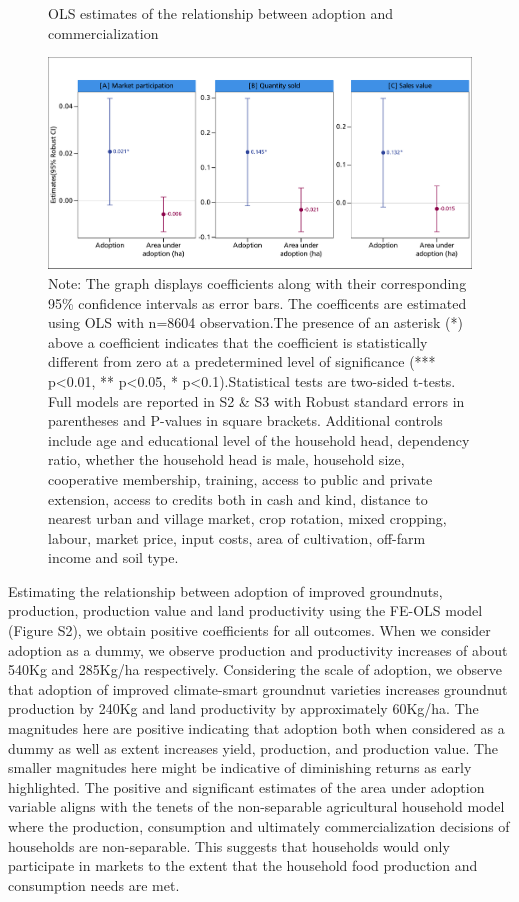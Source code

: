 \documentclass[
]{article}
\begin{document}
\begin{figure}[htbp]
\centering
\caption{OLS estimates of the relationship between adoption and commercialization}
\includegraphics[width=\textwidth]{figures/fig_SM1.pdf}

\caption*{
Note: The graph displays coefficients along with their corresponding 95\% confidence intervals as error bars. The coefficents are estimated using OLS with n=8604 observation.The presence of an asterisk (*) above a coefficient indicates that the coefficient is statistically different from zero at a predetermined level of significance (*** p<0.01, ** p<0.05, * p<0.1).Statistical tests are two-sided t-tests. Full models are reported in S2 \& S3 with  Robust standard errors in parentheses and P-values in square brackets. Additional controls include age and educational level of the household head, dependency ratio, whether the household head is male, household size, cooperative membership, training, access to public and private extension, access to credits both in cash and kind, distance to nearest urban and village market, crop rotation, mixed cropping, labour, market price, input costs, area of cultivation, off-farm income and soil type.
}
\end{figure}
\newpage

Estimating the relationship between adoption of improved groundnuts, production, production value and land productivity using the FE-OLS model (Figure S2), we obtain positive coefficients for all outcomes. When we consider adoption as a dummy, we observe production and productivity increases of about 540Kg and 285Kg/ha respectively. Considering the scale of adoption, we observe that adoption of improved climate-smart groundnut varieties increases groundnut production by 240Kg and land productivity by approximately 60Kg/ha. The magnitudes here are positive indicating that adoption both when considered as a dummy as well as extent increases yield, production, and production value. The smaller magnitudes here might be indicative of diminishing returns as early highlighted. The positive and significant estimates of the area under adoption variable aligns with the tenets of the non-separable agricultural household model where the production, consumption and ultimately commercialization decisions of households are non-separable. This suggests that households would only participate in markets to the extent that the household food production and consumption needs are met.
\end{document}
